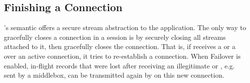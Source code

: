 \subsection{Finishing a \tcpls Connection}\label{design.closing}

\tcpls's semantic offers a secure stream abstraction to the application.
The only way to gracefully closes a \tcp connection in a \tcpls session
is by securely closing all streams attached to it, then \tcpls gracefully closes the
\tcp connection. That is, if \tcpls receives a \rst or a \fin over an active
\tcp connection, it tries to re-establish a \tcp connection.
When Failover is enabled, in-flight records that were lost after receiving
an illegitimate \rst or \fin, e.g. sent by a middlebox, can be transmitted again by \tcpls
on this new \tcp connection.



